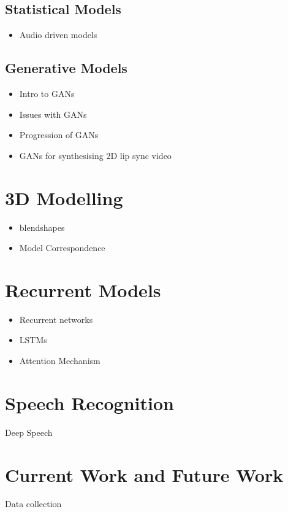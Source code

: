\documentclass[12pt]{article}
\begin{document}
\subsection{Statistical Models}
\begin{itemize}
    \item Audio driven models
\end{itemize}

\subsection{Generative Models}
\begin{itemize}
    \item Intro to GANs
    \item Issues with GANs
    \item Progression of GANs
    \item GANs for synthesising 2D lip sync video
\end{itemize}

\section{3D Modelling}
\begin{itemize}
    \item blendshapes
    \item Model Correspondence
\end{itemize}

\section{Recurrent Models}
\begin{itemize}
    \item Recurrent networks
    \item LSTMs
    \item Attention Mechanism
\end{itemize}


\section{Speech Recognition}
Deep Speech \cite{Karras2017a}

\section{Current Work and Future Work}
Data collection



\end{document}
